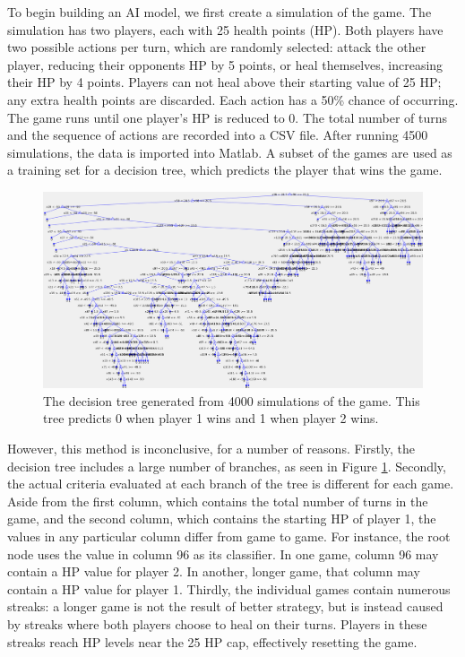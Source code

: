 To begin building an AI model, we first create a simulation of the game. The simulation has two players, each with 25 health points (HP). Both players have two possible actions per turn, which are randomly selected: attack the other player, reducing their opponents HP by 5 points, or heal themselves, increasing their HP by 4 points. Players can not heal above their starting value of 25 HP; any extra health points are discarded. Each action has a 50\% chance of occurring. The game runs until one player's HP is reduced to 0. The total number of turns and the sequence of actions are recorded into a CSV file. After running 4500 simulations, the data is imported into Matlab. A subset of the games are used as a training set for a decision tree, which predicts the player that wins the game.\\

\begin{figure}[H]
  \centering
  \includegraphics[width=13cm]{figures/firstDecisionTree.png}
  \caption{The decision tree generated from 4000 simulations of the game. This tree predicts 0 when player 1 wins and 1 when player 2 wins.}
  \label{fig:decisionTree1}
\end{figure}

However, this method is inconclusive, for a number of reasons. Firstly, the decision tree includes a large number of branches, as seen in Figure \ref{fig:decisionTree1}. Secondly, the actual criteria evaluated at each branch of the tree is different for each game. Aside from the first column, which contains the total number of turns in the game, and the second column, which contains the starting HP of player 1, the values in any particular column differ from game to game. For instance, the root node uses the value in column 96 as its classifier. In one game, column 96 may contain a HP value for player 2. In another, longer game, that column may contain a HP value for player 1. Thirdly, the individual games contain numerous streaks: a longer game is not the result of better strategy, but is instead caused by streaks where both players choose to heal on their turns. Players in these streaks reach HP levels near the 25 HP cap, effectively resetting the game.

